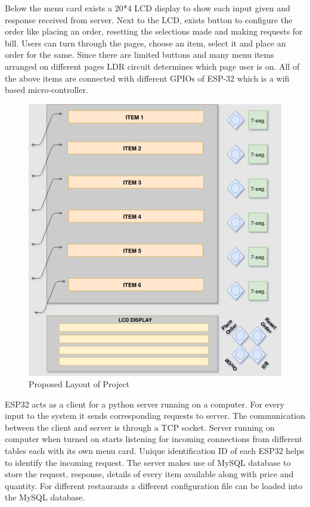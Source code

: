\documentclass[12pt,a4paper]{article}
\begin{document}
		Below the menu card exists a 20*4 LCD display to show each input given and response received from server. Next to the LCD, exists button to configure the order like placing an order, resetting the selections made and making requests for bill. Users can turn through the pages, choose an item, select it and place an order for the same. Since there are limited buttons and many menu items arranged on different pages LDR circuit determines which page user is on. All of the above items are connected with different GPIOs of ESP-32 which is a wifi based micro-controller. 
		\begin{figure}[h]
			\centering
			\caption{Proposed Layout of Project}
			\includegraphics[scale=.5]{layout}
		\end{figure}
		
		ESP32 acts as a client for a python server running on a computer. For every input to the system it sends corresponding requests to server. The communication between the client and server is through a TCP socket. Server running on computer when turned on starts listening for incoming connections from different tables each with its own menu card. Unique identification ID of each ESP32 helps to identify the incoming request. The server makes use of MySQL database to store the request, response, details of every item available along with price and quantity. For different restaurants a different configuration file can be loaded into the MySQL database.
        
\end{document}

